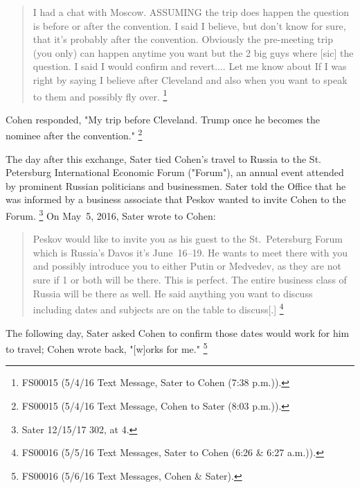 \begin{quote}
I had a chat with Moscow.
ASSUMING the trip does happen the question is before or after the convention.
I said I believe, but don't know for sure, that it's probably after the convention.
Obviously the pre-meeting trip (you only) can happen anytime you want but the 2 big guys where [sic] the question.
I said I would confirm and revert....
Let me know about If I was right by saying I believe after Cleveland and also when you want to speak to them and possibly fly over.%
\footnote{FS00015 (5/4/16 Text Message, Sater to Cohen (7:38 p.m.)).}
\end{quote}

Cohen responded, "My trip before Cleveland.
Trump once he becomes the nominee after the convention."%
\footnote{FS00015 (5/4/16 Text Message, Cohen to Sater (8:03 p.m.)).}

The day after this exchange, Sater tied Cohen's travel to Russia to the St. Petersburg International Economic Forum ("Forum"), an annual event attended by prominent Russian politicians and businessmen.
Sater told the Office that he was informed by a business associate that Peskov wanted to invite Cohen to the Forum.%
\footnote{Sater 12/15/17 302, at 4.}
On May~5, 2016, Sater wrote to Cohen:

\begin{quote}
Peskov would like to invite you as his guest to the St.~Petersburg Forum which is Russia's Davos it's June~16--19.
He wants to meet there with you and possibly introduce you to either Putin or Medvedev, as they are not sure if 1 or both will be there.
This is perfect.
The entire business class of Russia will be there as well.
He said anything you want to discuss including dates and subjects are on the table to discuss[.]%
\footnote{FS00016 (5/5/16 Text Messages, Sater to Cohen (6:26 \& 6:27 a.m.)).}
\end{quote}

The following day, Sater asked Cohen to confirm those dates would work for him to travel; Cohen wrote back, "[w]orks for me."%
\footnote{FS00016 (5/6/16 Text Messages, Cohen \& Sater).}

